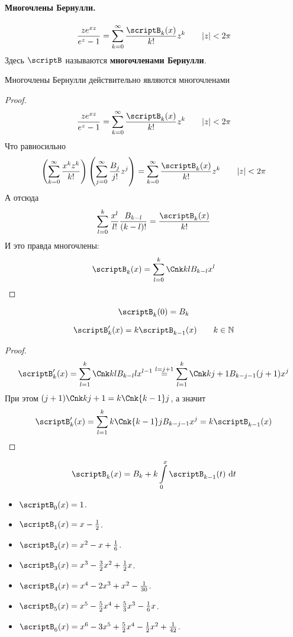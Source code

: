 \documentclass{article}
\begin{document}
    \paragraph{Многочлены Бернулли.}
    \begin{definition}
        $$
        \frac{ze^{xz}}{e^z-1}=\sum\limits_{k=0}^\infty\frac{\scriptB_k(x)}{k!}z^k\qquad |z|<2\pi
        $$
        Здесь $\scriptB$ называются \textbf{многочленами Бернулли}.
    \end{definition}
    \begin{theorem}
        Многочлены Бернулли действительно являются многочленами
    \end{theorem}
    \begin{proof}
        $$
        \frac{ze^{xz}}{e^z-1}=\sum\limits_{k=0}^\infty\frac{\scriptB_k(x)}{k!}z^k\qquad |z|<2\pi
        $$
        Что равносильно
        $$
        \left(\sum\limits_{k=0}^\infty\frac{x^kz^k}{k!}\right)\left(\sum\limits_{j=0}^\infty\frac{B_j}{j!}z^j\right)=\sum\limits_{k=0}^\infty\frac{\scriptB_k(x)}{k!}z^k\qquad |z|<2\pi
        $$
        А отсюда
        $$
        \sum\limits_{l=0}^k\frac{x^l}{l!}\frac{B_{k-l}}{(k-l)!}=\frac{\scriptB_k(x)}{k!}
        $$
        И это правда многочлены:
        $$
        \scriptB_k(x)=\sum\limits_{l=0}^k\Cnk klB_{k-l}x^l
        $$
    \end{proof}
    \begin{property}
        $$
        \scriptB_k(0)=B_k
        $$
    \end{property}
    \begin{property}
        $$
        \scriptB_k'(x)=k\scriptB_{k-1}(x)\qquad k\in\mathbb N
        $$
    \end{property}
    \begin{proof}
        $$
        \scriptB_k'(x)=\sum\limits_{l=1}^k\Cnk kl B_{k-l}lx^{l-1}\overset{l=j+1}=\sum\limits_{l=1}^k\Cnk k{j+1} B_{k-j-1}(j+1)x^j
        $$
        При этом $(j+1)\Cnk k{j+1}=k\Cnk{k-1}j$, а значит
        $$
        \scriptB_k'(x)=\sum\limits_{l=1}^kk\Cnk{k-1}jB_{k-j-1}x^j=k\scriptB_{k-1}(x)
        $$
    \end{proof}
    \begin{corollary}
        $$
        \scriptB_k(x)=B_k+k\int\limits_0^x\scriptB_{k-1}(t)~\mathrm dt
        $$
    \end{corollary}
    \begin{example}
        \begin{itemize}
            \item $\scriptB_0(x)=1$.
            \item $\scriptB_1(x)=x-\frac12$.
            \item $\scriptB_2(x)=x^2-x+\frac16$.
            \item $\scriptB_3(x)=x^3-\frac32x^2+\frac12x$.
            \item $\scriptB_4(x)=x^4-2x^3+x^2-\frac1{30}$.
            \item $\scriptB_5(x)=x^5-\frac52x^4+\frac53x^3-\frac16x$.
            \item $\scriptB_6(x)=x^6-3x^5+\frac52x^4-\frac12x^2+\frac1{42}$.
        \end{itemize}
    \end{example}
\end{document}
